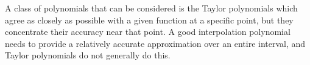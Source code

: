 A class of polynomials that can be considered is the Taylor polynomials which agree as closely as possible with a given function at a specific point, but they concentrate their accuracy near that point. A good interpolation polynomial needs to provide a relatively accurate approximation over an entire interval, and Taylor polynomials do not generally do this. 
%
%
%
%
%
%
%
%
%
%
%
%
%
